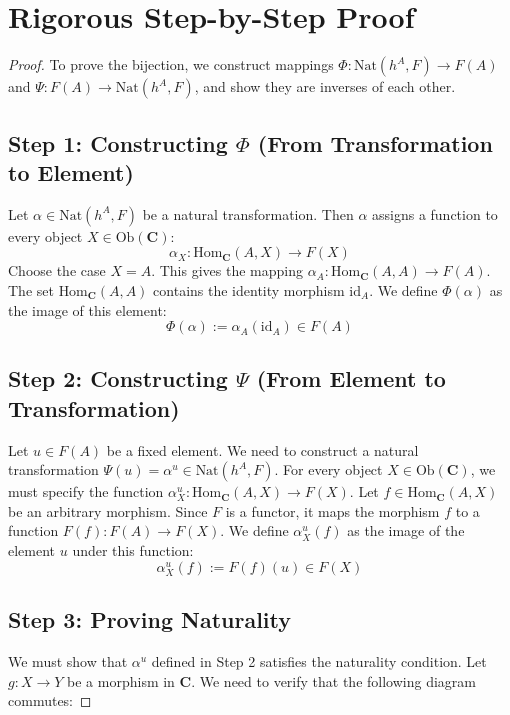 \documentclass[11pt,a4paper,oneside]{book}
\theoremstyle{definition}
\theoremstyle{plain}
\newcommand{\Cat}[1]{\mathbf{#1}}
\newcommand{\Hom}{\text{Hom}}
\newcommand{\id}{\text{id}}
\newcommand{\Nat}{\text{Nat}}
\begin{document}
\section{Rigorous Step-by-Step Proof}

\begin{proof}
To prove the bijection, we construct mappings $\Phi: \Nat(h^A, F) \to F(A)$ and $\Psi: F(A) \to \Nat(h^A, F)$, and show they are inverses of each other.

\subsection*{Step 1: Constructing $\Phi$ (From Transformation to Element)}
Let $\alpha \in \Nat(h^A, F)$ be a natural transformation. Then $\alpha$ assigns a function to every object $X \in \text{Ob}(\Cat{C})$:
\[ \alpha_X: \Hom_{\Cat{C}}(A, X) \to F(X) \]
Choose the case $X = A$. This gives the mapping $\alpha_A: \Hom_{\Cat{C}}(A, A) \to F(A)$. The set $\Hom_{\Cat{C}}(A, A)$ contains the identity morphism $\id_A$.
We define $\Phi(\alpha)$ as the image of this element:
\begin{equation}
\Phi(\alpha) := \alpha_A(\id_A) \in F(A)
\end{equation}

\subsection*{Step 2: Constructing $\Psi$ (From Element to Transformation)}
Let $u \in F(A)$ be a fixed element. We need to construct a natural transformation $\Psi(u) = \alpha^u \in \Nat(h^A, F)$.
For every object $X \in \text{Ob}(\Cat{C})$, we must specify the function $\alpha^u_X: \Hom_{\Cat{C}}(A, X) \to F(X)$.
Let $f \in \Hom_{\Cat{C}}(A, X)$ be an arbitrary morphism. Since $F$ is a functor, it maps the morphism $f$ to a function $F(f): F(A) \to F(X)$.
We define $\alpha^u_X(f)$ as the image of the element $u$ under this function:
\begin{equation}
\alpha^u_X(f) := F(f)(u) \in F(X)
\end{equation}

\subsection*{Step 3: Proving Naturality}
We must show that $\alpha^u$ defined in Step 2 satisfies the naturality condition. Let $g: X \to Y$ be a morphism in $\Cat{C}$. We need to verify that the following diagram commutes:


\end{proof}
\end{document}

